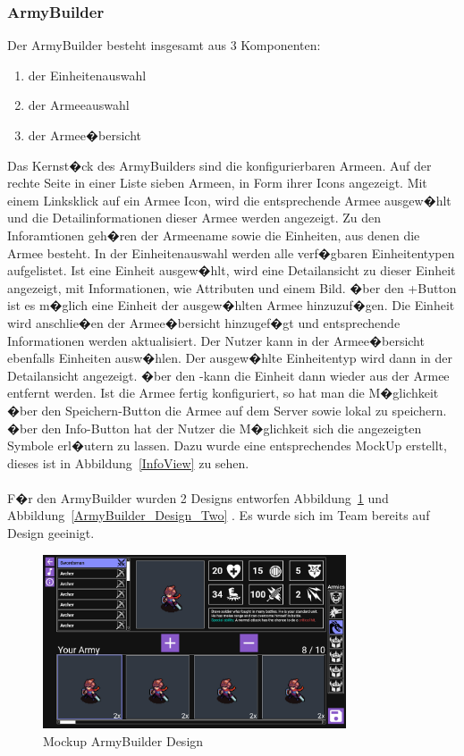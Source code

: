 \documentclass[12pt, titlepage]{scrartcl}
\newcommand{\RN}[1]{%
	\textup{\uppercase\expandafter{\romannumeral#1}}%
}
\newcommand{\Abb}[1]{%
	Abbildung\ \ref{#1}%
}
\begin{document}
		\subsubsection{ArmyBuilder}
			Der ArmyBuilder besteht insgesamt aus 3 Komponenten:
			\begin{enumerate}
				\item der Einheitenauswahl
				\item der Armeeauswahl
				\item der Armee�bersicht
			\end{enumerate}
		Das Kernst�ck des ArmyBuilders sind die konfigurierbaren Armeen. Auf der rechte Seite in einer Liste sieben Armeen, in Form ihrer Icons angezeigt. Mit einem Linksklick auf ein Armee Icon, wird die entsprechende Armee ausgew�hlt und die Detailinformationen dieser Armee werden angezeigt. Zu den Inforamtionen geh�ren der Armeename sowie die Einheiten, aus denen die Armee besteht. In der Einheitenauswahl werden alle verf�gbaren Einheitentypen aufgelistet. Ist eine Einheit ausgew�hlt, wird eine Detailansicht zu dieser Einheit angezeigt, mit Informationen, wie Attributen und einem Bild. �ber den \glqq +\grqq Button ist es m�glich eine Einheit der ausgew�hlten Armee hinzuzuf�gen. Die Einheit wird anschlie�en der Armee�bersicht hinzugef�gt und entsprechende Informationen werden aktualisiert. Der Nutzer kann in der Armee�bersicht ebenfalls Einheiten ausw�hlen. Der ausgew�hlte Einheitentyp wird dann in der Detailansicht angezeigt. �ber den \glqq -\grqq kann die Einheit dann wieder aus der Armee entfernt werden. Ist die Armee fertig konfiguriert, so hat man die M�glichkeit �ber den \glqq Speichern\grqq-Button die Armee auf dem Server sowie lokal zu speichern. �ber den \grqq Info\glqq-Button hat der Nutzer die M�glichkeit sich die angezeigten Symbole erl�utern zu lassen. Dazu wurde eine entsprechendes MockUp erstellt, dieses ist in \Abb{InfoView} zu sehen.\\ \\ F�r den ArmyBuilder wurden 2 Designs entworfen \Abb{ArmyBuilder_Design_One} und \Abb{ArmyBuilder_Design_Two}. Es wurde sich im Team bereits auf Design \RN{2} geeinigt. 
		\begin{figure}[H] 
			\centering
			\includegraphics[width=0.8\textwidth]{ArmyBuilder_Design_One.png}
			\caption{Mockup ArmyBuilder Design \RN{1} }
			\label{ArmyBuilder_Design_One}
		\end{figure}
\end{document}
